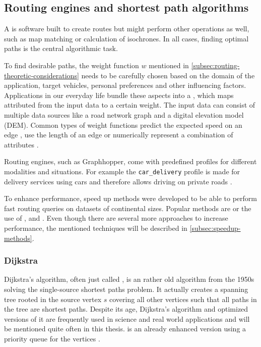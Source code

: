 	\subsection{Routing engines and shortest path algorithms}
	\label{subsec:routing-engines}
		
		A  is software built to create routes but might perform other operations as well, such as map matching or calculation of isochrones.
		In all cases, finding optimal paths is the central algorithmic task.
		
		To find desirable paths, the weight function $w$ mentioned in \cref{subsec:routing-theoretic-considerations} needs to be carefully chosen based on the domain of the application, target vehicles, personal preferences and other influencing factors.
		Applications in our everyday life bundle these aspects into a , which maps attributed from the input data to a certain weight.
		The input data can consist of multiple data sources like a road network graph and a digital elevation model (DEM).
		Common types of weight functions predict the expected speed on an edge \cite{graphhopper-profile-bike-speeds}, use the length of an edge \cite{graphhopper-profile-shortest} or numerically represent a combination of attributes \cite{graphhopper-profile-short-fastest}.
		
		Routing engines, such as Graphhopper, come with predefined profiles for different modalities and situations.
		For example the \texttt{car\_delivery} profile is made for delivery services using cars and therefore allows driving on private roads \cite{graphhopper-routing-profiles}.
		
		To enhance performance, speed up methods were developed to be able to perform fast routing queries on datasets of continental sizes.
		Popular methods are  or the use of ,  and .
		Even though there are several more approaches to increase performance, the mentioned techniques will be described in \cref{subsec:speedup-methods}.
		
		\subsubsection{Dijkstra}
		\label{subsubsec:dijkstra}
		
			Dijkstra's algorithm, often just called , is an rather old algorithm from the 1950s solving the single-source shortest paths problem.
			It actually creates a spanning tree rooted in the source vertex $s$ covering all other vertices such that all paths in the tree are shortest paths.
			Despite its age, Dijkstra's algorithm and optimized versions of it are frequently used in science and real world applications and will be mentioned quite often in this thesis.
			 is an already enhanced version using a priority queue for the vertices \cite[658]{cormen-introduction-to-alg}.
			
